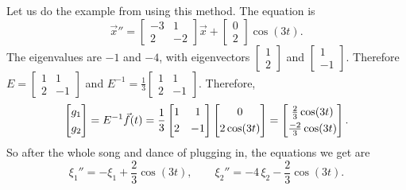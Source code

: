\begin{example}
Let us do the example from  using this method.
The equation is
\begin{equation*}
{\vec{x}}'' =
\begin{bmatrix}
-3 & 1 \\
2 & -2
\end{bmatrix}
\vec{x} 
+ 
\begin{bmatrix}
0 \\ 2
\end{bmatrix}
\cos (3 t) .
\end{equation*}
The eigenvalues are $-1$ and $-4$, with eigenvectors 
$\left[ \begin{smallmatrix} 1 \\ 2 \end{smallmatrix} \right]$ and
$\left[ \begin{smallmatrix} 1 \\ -1 \end{smallmatrix} \right]$.
Therefore $E =
\left[ \begin{smallmatrix} 1 & 1 \\ 2 & -1 \end{smallmatrix} \right]$
and
$E^{-1} =
\frac{1}{3}
\left[ \begin{smallmatrix} 1 & 1 \\ 2 & -1 \end{smallmatrix}
\right]$.
Therefore,
\begin{equation*}
\begin{bmatrix}
g_1 \\
\noalign{\smallskip}
g_2
\end{bmatrix}
=
E^{-1} \vec{f}(t)
=
\frac{1}{3}
\begin{bmatrix} 1 & 1 \\
\noalign{\smallskip}
2 & -1 \end{bmatrix}
\begin{bmatrix} 0 \\
\noalign{\smallskip}
2\cos (3t) \end{bmatrix}
=
\begin{bmatrix} \frac{2}{3}\cos (3t)
\\
\noalign{\smallskip}
\frac{-2}{3}\cos (3t) \end{bmatrix} .
\end{equation*}
So after the whole song and dance of plugging in, the equations we get are
\begin{equation*}
\xi_1'' = - \xi_1 + \frac{2}{3} \cos (3t) , \qquad
\xi_2'' = -4 \, \xi_2 - \frac{2}{3} \cos (3t) .

\end{equation*}
\end{example}
